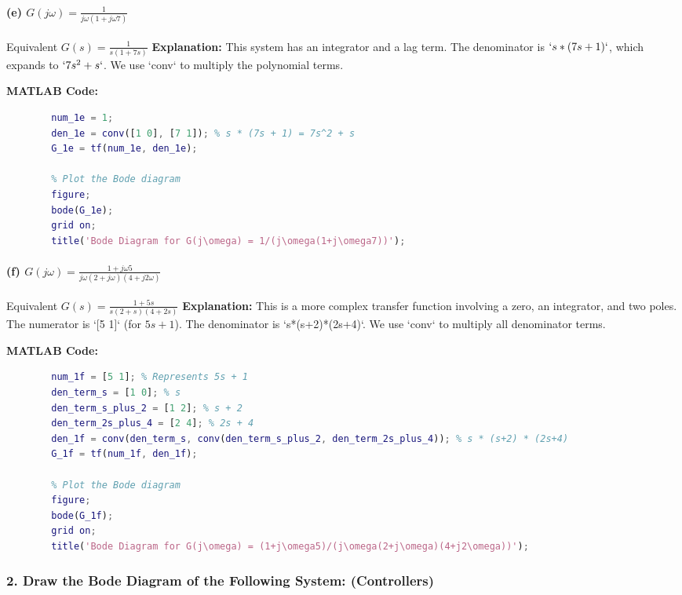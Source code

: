 \documentclass[a4paper,12pt]{article}
\begin{document}
	\paragraph{(e) $G(j\omega) = \frac{1}{j\omega(1+j\omega7)}$}
	Equivalent $G(s) = \frac{1}{s(1+7s)}$
	\textbf{Explanation:}
	This system has an integrator and a lag term. The denominator is $`s*(7s+1)`$, which expands to $`7s^2 + s`$. We use `conv` to multiply the polynomial terms.
	
	\textbf{MATLAB Code:}
	\begin{lstlisting}[language=Matlab, caption=MATLAB Code for Problem 1(e)]
		% Define the transfer function G(s) = 1 / (s(1+7s))
		num_1e = 1;
		den_1e = conv([1 0], [7 1]); % s * (7s + 1) = 7s^2 + s
		G_1e = tf(num_1e, den_1e);
		
		% Plot the Bode diagram
		figure;
		bode(G_1e);
		grid on;
		title('Bode Diagram for G(j\omega) = 1/(j\omega(1+j\omega7))');
	\end{lstlisting}
	
	\paragraph{(f) $G(j\omega) = \frac{1+j\omega5}{j\omega(2+j\omega)(4+j2\omega)}$}
	Equivalent $G(s) = \frac{1+5s}{s(2+s)(4+2s)}$
	\textbf{Explanation:}
	This is a more complex transfer function involving a zero, an integrator, and two poles. The numerator is `[5 1]` (for $5s+1$). The denominator is `s*(s+2)*(2s+4)`. We use `conv` to multiply all denominator terms.
	
	\textbf{MATLAB Code:}
	\begin{lstlisting}[language=Matlab, caption=MATLAB Code for Problem 1(f)]
		% Define the transfer function G(s) = (1+5s) / (s(2+s)(4+2s))
		num_1f = [5 1]; % Represents 5s + 1
		den_term_s = [1 0]; % s
		den_term_s_plus_2 = [1 2]; % s + 2
		den_term_2s_plus_4 = [2 4]; % 2s + 4
		den_1f = conv(den_term_s, conv(den_term_s_plus_2, den_term_2s_plus_4)); % s * (s+2) * (2s+4)
		G_1f = tf(num_1f, den_1f);
		
		% Plot the Bode diagram
		figure;
		bode(G_1f);
		grid on;
		title('Bode Diagram for G(j\omega) = (1+j\omega5)/(j\omega(2+j\omega)(4+j2\omega))');
	\end{lstlisting}
	
	\subsubsection*{2. Draw the Bode Diagram of the Following System: (Controllers)}
	
\end{document}
